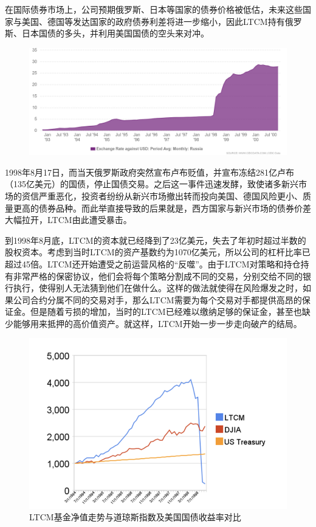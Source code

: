 在国际债券市场上，公司预期俄罗斯、日本等国家的债券价格被低估，未来这些国家与美国、德国等发达国家的政府债券利差将进一步缩小，因此LTCM持有俄罗斯、日本国债的多头，并利用美国国债的空头来对冲。
    \begin{figure}
        \centering
        \includegraphics[width=\linewidth]{img/rub_usd.png}
    \end{figure}
1998年8月17日，而当天俄罗斯政府突然宣布卢布贬值，并宣布冻结281亿卢布（135亿美元）的国债，停止国债交易。之后这一事件迅速发酵，致使诸多新兴市场的资信严重恶化，投资者纷纷从新兴市场撤出转而投向美国、德国风险更小、质量更高的债券品种。而此举直接导致的后果就是，西方国家与新兴市场的债券价差大幅拉开，LTCM由此遭受暴击。

到1998年8月底，LTCM的资本就已经降到了23亿美元，失去了年初时超过半数的股权资本。考虑到当时LTCM的资产基数约为1070亿美元，所以公司的杠杆比率已超过45倍。LTCM还开始遭受之前运营风格的“反噬”。由于LTCM对策略和持仓持有非常严格的保密协议，他们会将每个策略分割成不同的交易，分别交给不同的银行执行，使得别人无法猜到他们在做什么。这样的做法就使得在风险爆发之时，如果公司合约分属不同的交易对手，那么LTCM需要为每个交易对手都提供高昂的保证金。但是随着亏损的增加，当时的LTCM已经难以缴纳足够的保证金，甚至也缺少能够用来抵押的高价值资产。就这样，LTCM开始一步一步走向破产的结局。
\begin{figure}[H]
    \centering
    \includegraphics[width=\linewidth]{img/图片 1.png}
    \caption{LTCM基金净值走势与道琼斯指数及美国国债收益率对比}
\end{figure}
